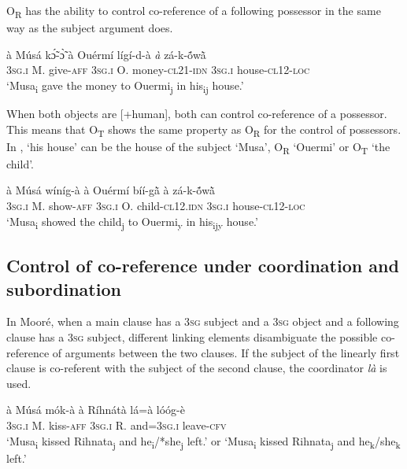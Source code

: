 \documentclass[output=paper]{langsci/langscibook}
\begin{document}
O\textsubscript{R} has the ability to control co-reference of a following possessor in the same way as the subject argument does.

\ea
\label{ex:35.pacchiarotti}
\gll à Músá kɔ̃́-ɔ̃̀ à Ouérmí lígí-d-à \textit{à} zá-k-\'{õ}w\`{ã}  \\
\textsc{3sg.i}  M.  give-\textsc{aff} \textsc{3sg.i} O. money-\textsc{cl21-idn} \textsc{3sg.i}  house-\textsc{cl12-loc}\\
\glt `Musa\textsubscript{i} gave the money to Ouermi\textsubscript{j} in his\textsubscript{ij} house.'
\z

When both objects are [+human], both can control co-reference of a possessor. This means that O\textsubscript{T} shows the same property as O\textsubscript{R} for the control of possessors. In , `his house' can be the house of the subject `Musa', O\textsubscript{R} `Ouermi' or O\textsubscript{T} `the child'.

\ea
\label{ex:36.pacchiarotti}
\gll à Músá wíníg-à à Ouérmí bíí-g\`{ã} à zá-k-\'{õ}w\`{ã}  \\
\textsc{3sg.i}  M.  show-\textsc{aff} \textsc{3sg.i} O. child\textsc{-cl12.idn} \textsc{3sg.i} house-\textsc{cl12-loc}\\
\glt `Musa\textsubscript{i} showed the child\textsubscript{j} to Ouermi\textsubscript{y} in his\textsubscript{ijy} house.' 
\z

\subsection{Control of co-reference under coordination and subordination}\label{§5.3:control.pacchiarotti}

In Mooré, when a main clause has a 3\textsc{sg} subject and a 3\textsc{sg} object and a following clause has a 3\textsc{sg} subject, different linking elements disambiguate the possible co-reference of arguments between the two clauses. If the subject of the linearly first clause is co-referent with the subject of the second clause, the coordinator \textit{là} is used.

\ea
\label{ex:37.pacchiarotti}
\gll à    Músá  mók-à    à    Ríhnátà  lá=à      lóóg-è\\
\textsc{3sg.i}    M.  kiss-\textsc{aff}  \textsc{3sg.i} R.    and=\textsc{3sg.i}    leave-\textsc{cfv}\\
\glt `Musa\textsubscript{i} kissed Rihnata\textsubscript{j} and he\textsubscript{i}/*she\textsubscript{j} left.' or `Musa\textsubscript{i} kissed Rihnata\textsubscript{j} and he\textsubscript{k}/she\textsubscript{k} left.'
\z
\end{document}
